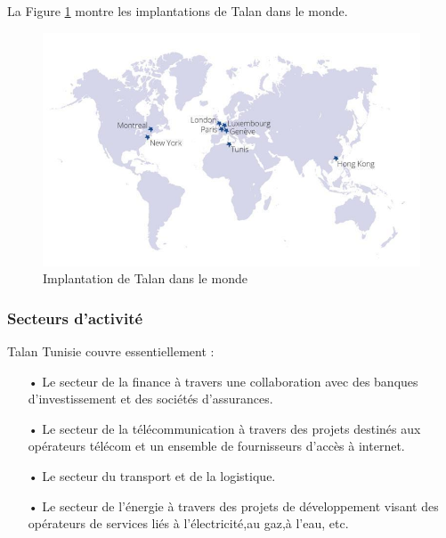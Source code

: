 La Figure \ref{fig:talan-monde} montre les implantations de Talan dans le monde.


\begin{figure}[H]
\includegraphics[scale=0.6]{img/talan1.jpg}
\centering
\caption{Implantation de Talan dans le monde}
\label{fig:talan-monde}
\end{figure}
\subsubsection{Secteurs d’activité}
Talan Tunisie couvre essentiellement :
\begin{itemize}
\item[•]  Le secteur de la finance à travers une collaboration avec des banques d’investissement et des sociétés d'assurances.
\item[•] Le secteur de la télécommunication à travers des projets destinés aux opérateurs télécom et un ensemble de fournisseurs d’accès à internet.
\item[•] Le secteur du transport et de la logistique.
\item[•] Le secteur de l’énergie à travers des projets de développement visant des opérateurs de services liés à l’électricité,au gaz,à l'eau, etc.
\end{itemize}
